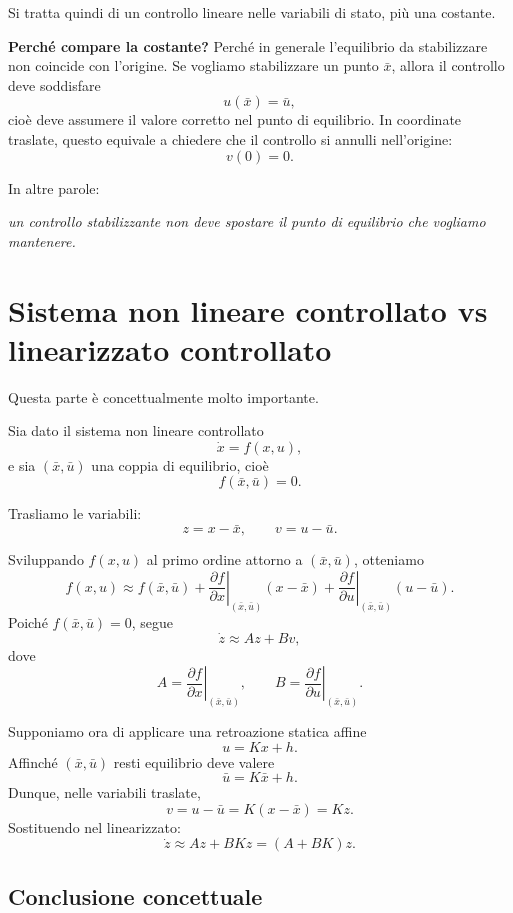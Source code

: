 Si tratta quindi di un controllo lineare nelle variabili di stato, pi\`u una costante.

\medskip

\noindent
\textbf{Perch\'e compare la costante?}  
Perch\'e in generale l'equilibrio da stabilizzare non coincide con l'origine. Se vogliamo stabilizzare un punto \(\bar x\), allora il controllo deve soddisfare
\[
u(\bar x)=\bar u,
\]
cio\`e deve assumere il valore corretto nel punto di equilibrio. In coordinate traslate, questo equivale a chiedere che il controllo si annulli nell'origine:
\[
v(0)=0.
\]

\medskip

\noindent
In altre parole:
\begin{center}
\emph{un controllo stabilizzante non deve spostare il punto di equilibrio che vogliamo mantenere.}
\end{center}

\section{Sistema non lineare controllato vs linearizzato controllato}

Questa parte \`e concettualmente molto importante.

Sia dato il sistema non lineare controllato
\[
\dot x = f(x,u),
\]
e sia \((\bar x,\bar u)\) una coppia di equilibrio, cio\`e
\[
f(\bar x,\bar u)=0.
\]

Trasliamo le variabili:
\[
z = x-\bar x,
\qquad
v = u-\bar u.
\]

Sviluppando \(f(x,u)\) al primo ordine attorno a \((\bar x,\bar u)\), otteniamo
\[
f(x,u)\approx f(\bar x,\bar u)
+ \left.\frac{\partial f}{\partial x}\right|_{(\bar x,\bar u)} (x-\bar x)
+ \left.\frac{\partial f}{\partial u}\right|_{(\bar x,\bar u)} (u-\bar u).
\]
Poich\'e \(f(\bar x,\bar u)=0\), segue
\[
\dot z \approx Az + Bv,
\]
dove
\[
A=\left.\frac{\partial f}{\partial x}\right|_{(\bar x,\bar u)},
\qquad
B=\left.\frac{\partial f}{\partial u}\right|_{(\bar x,\bar u)}.
\]

Supponiamo ora di applicare una retroazione statica affine
\[
u = Kx + h.
\]
Affinch\'e \((\bar x,\bar u)\) resti equilibrio deve valere
\[
\bar u = K\bar x + h.
\]
Dunque, nelle variabili traslate,
\[
v = u-\bar u = K(x-\bar x)=Kz.
\]
Sostituendo nel linearizzato:
\[
\dot z \approx Az + BKz = (A+BK)z.
\]

\subsection{Conclusione concettuale}


